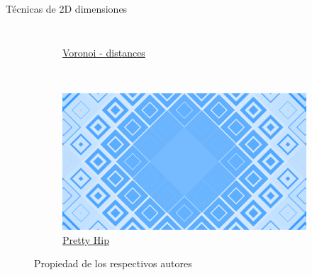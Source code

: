 \begin{frame}{Técnicas de 2D dimensiones}
\begin{columns}
\begin{figure}[htp]
\begin{subfigure}[b]{0.42\textwidth}
   \caption{\href{https://www.shadertoy.com/view/ldl3W8}{Voronoi - distances}}
 \end{subfigure}
~
 \begin{subfigure}[b]{0.42\textwidth}
   \includegraphics[width=\textwidth]{img/2D/PrettyHip}
   \caption{\href{https://www.shadertoy.com/view/XsBfRW}{Pretty Hip}}
 \end{subfigure}
 \caption{Propiedad de los respectivos autores}
\end{figure}
\end{columns}
\end{frame}

